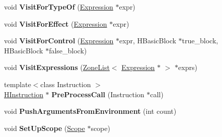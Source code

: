 \begin{DoxyCompactItemize}
\item 
\hypertarget{classv8_1_1internal_1_1_h_optimized_graph_builder_a29d49ae6c2388ca5dcc5a77c307abb6d}{}void {\bfseries Visit\+For\+Type\+Of} (\hyperlink{classv8_1_1internal_1_1_expression}{Expression} $\ast$expr)\label{classv8_1_1internal_1_1_h_optimized_graph_builder_a29d49ae6c2388ca5dcc5a77c307abb6d}

\item 
\hypertarget{classv8_1_1internal_1_1_h_optimized_graph_builder_ae5050fd03fa6ed908ab202038ac75259}{}void {\bfseries Visit\+For\+Effect} (\hyperlink{classv8_1_1internal_1_1_expression}{Expression} $\ast$expr)\label{classv8_1_1internal_1_1_h_optimized_graph_builder_ae5050fd03fa6ed908ab202038ac75259}

\item 
\hypertarget{classv8_1_1internal_1_1_h_optimized_graph_builder_a12e689463aa85cb2d40d3525533fab19}{}void {\bfseries Visit\+For\+Control} (\hyperlink{classv8_1_1internal_1_1_expression}{Expression} $\ast$expr, H\+Basic\+Block $\ast$true\+\_\+block, H\+Basic\+Block $\ast$false\+\_\+block)\label{classv8_1_1internal_1_1_h_optimized_graph_builder_a12e689463aa85cb2d40d3525533fab19}

\item 
\hypertarget{classv8_1_1internal_1_1_h_optimized_graph_builder_a4935776d929c0151ceb4bbbc69459bf0}{}void {\bfseries Visit\+Expressions} (\hyperlink{classv8_1_1internal_1_1_zone_list}{Zone\+List}$<$ \hyperlink{classv8_1_1internal_1_1_expression}{Expression} $\ast$ $>$ $\ast$exprs)\label{classv8_1_1internal_1_1_h_optimized_graph_builder_a4935776d929c0151ceb4bbbc69459bf0}

\item 
\hypertarget{classv8_1_1internal_1_1_h_optimized_graph_builder_ae3a68301b25bbe28b1d1038df302d5f2}{}{\footnotesize template$<$class Instruction $>$ }\\\hyperlink{classv8_1_1internal_1_1_h_instruction}{H\+Instruction} $\ast$ {\bfseries Pre\+Process\+Call} (Instruction $\ast$call)\label{classv8_1_1internal_1_1_h_optimized_graph_builder_ae3a68301b25bbe28b1d1038df302d5f2}

\item 
\hypertarget{classv8_1_1internal_1_1_h_optimized_graph_builder_a6c4f576fef680c4869d41bd262ef799e}{}void {\bfseries Push\+Arguments\+From\+Environment} (int count)\label{classv8_1_1internal_1_1_h_optimized_graph_builder_a6c4f576fef680c4869d41bd262ef799e}

\item 
\hypertarget{classv8_1_1internal_1_1_h_optimized_graph_builder_a68ee92e0626dcd53348495c9de6ac7a6}{}void {\bfseries Set\+Up\+Scope} (\hyperlink{classv8_1_1internal_1_1_scope}{Scope} $\ast$scope)\label{classv8_1_1internal_1_1_h_optimized_graph_builder_a68ee92e0626dcd53348495c9de6ac7a6}


\end{DoxyCompactItemize}
